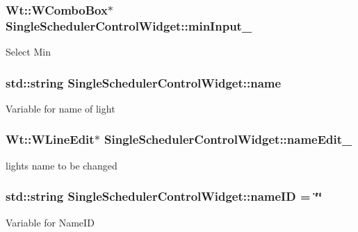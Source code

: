 \subsubsection[{\texorpdfstring{min\+Input\+\_\+}{minInput_}}]{\setlength{\rightskip}{0pt plus 5cm}Wt\+::\+W\+Combo\+Box$\ast$ Single\+Scheduler\+Control\+Widget\+::min\+Input\+\_\+\hspace{0.3cm}{\ttfamily [private]}}\hypertarget{classSingleSchedulerControlWidget_aba279034b626322922706c0ce95468c6}{}\label{classSingleSchedulerControlWidget_aba279034b626322922706c0ce95468c6}
Select Min 
\subsubsection[{\texorpdfstring{name}{name}}]{\setlength{\rightskip}{0pt plus 5cm}std\+::string Single\+Scheduler\+Control\+Widget\+::name\hspace{0.3cm}{\ttfamily [private]}}\hypertarget{classSingleSchedulerControlWidget_a5d3c98481e521dbcbde9d78ef0422c70}{}\label{classSingleSchedulerControlWidget_a5d3c98481e521dbcbde9d78ef0422c70}
Variable for name of light 
\subsubsection[{\texorpdfstring{name\+Edit\+\_\+}{nameEdit_}}]{\setlength{\rightskip}{0pt plus 5cm}Wt\+::\+W\+Line\+Edit$\ast$ Single\+Scheduler\+Control\+Widget\+::name\+Edit\+\_\+\hspace{0.3cm}{\ttfamily [private]}}\hypertarget{classSingleSchedulerControlWidget_adea2cd6431251b3e725a2e71ea53e98e}{}\label{classSingleSchedulerControlWidget_adea2cd6431251b3e725a2e71ea53e98e}
light\textquotesingle{}s name to be changed 
\subsubsection[{\texorpdfstring{name\+ID}{nameID}}]{\setlength{\rightskip}{0pt plus 5cm}std\+::string Single\+Scheduler\+Control\+Widget\+::name\+ID = \char`\"{}\char`\"{}\hspace{0.3cm}{\ttfamily [private]}}\hypertarget{classSingleSchedulerControlWidget_ae803e75c73103097b72fc1e192a2c737}{}\label{classSingleSchedulerControlWidget_ae803e75c73103097b72fc1e192a2c737}
Variable for Name\+ID 
